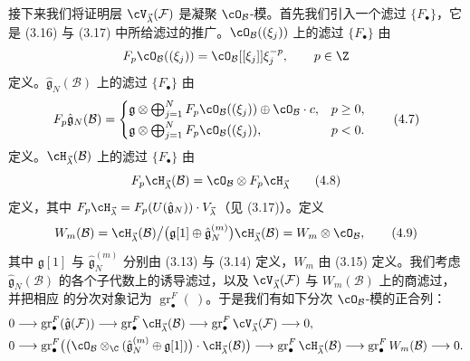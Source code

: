 接下来我们将证明层 $\cV_{\vec{\lambda}}(\mathcal{F})$ 是凝聚
$\cO_\mathcal{B}$-模。首先我们引入一个滤过 $\{F_\bullet\}$，它是 (3.16) 与
(3.17) 中所给滤过的推广。$\cO_\mathcal{B}((\xi_j))$ 上的滤过
$\{F_\bullet\}$ 由
\[
  F_p\cO_\mathcal{B}((\xi_j)) = \cO_\mathcal{B}[[\xi_j]]\xi_j^{-p},
  \qquad p\in\Z
\]
定义。$\hat{\mathfrak{g}}_N(\mathcal{B})$ 上的滤过 $\{F_\bullet\}$ 由
\begin{equation}
  F_p\hat{\mathfrak{g}}_N(\mathcal{B}) =
  \begin{cases}
    \mathfrak{g}\otimes\bigoplus_{j=1}^NF_p\cO_\mathcal{B}((\xi_j))
    \oplus\cO_\mathcal{B}\cdot c, & p\ge 0,\\[2pt]
    \mathfrak{g}\otimes\bigoplus_{j=1}^NF_p\cO_\mathcal{B}((\xi_j)), & p<0.
  \end{cases}
  \tag{4.7}
\end{equation}
定义。$\cH_{\vec{\lambda}}(\mathcal{B})$ 上的滤过 $\{F_\bullet\}$ 由
\begin{equation}
  F_p\cH_{\vec{\lambda}}(\mathcal{B})
  = \cO_\mathcal{B}\otimes F_p\cH_{\vec{\lambda}} \tag{4.8}
\end{equation}
定义，其中 $F_p\cH_{\vec{\lambda}}
=F_p(U(\hat{\mathfrak{g}}_N))\cdot V_{\vec{\lambda}}$（见 (3.17)）。定义
\begin{equation}
  W_m(\mathcal{B}) = \cH_{\vec{\lambda}}(\mathcal{B})
  \big/\bigl(\mathfrak{g}[1]\oplus\hat{\mathfrak{g}}_N^{(m)}\bigr)
  \cH_{\vec{\lambda}}(\mathcal{B})
  = W_m\otimes\cO_\mathcal{B}, \tag{4.9}
\end{equation}
其中 $\mathfrak{g}[1]$ 与 $\hat{\mathfrak{g}}_N^{(m)}$ 分别由 (3.13) 与 (3.14)
定义，$W_m$ 由 (3.15) 定义。我们考虑
$\hat{\mathfrak{g}}_N(\mathcal{B})$ 的各个子代数上的诱导滤过，以及
$\cV_{\vec{\lambda}}(\mathcal{F})$ 与 $W_m(\mathcal{B})$ 上的商滤过，并把相应
的分次对象记为 $\operatorname{gr}^F_\bullet(\ )$。于是我们有如下分次
$\cO_\mathcal{B}$-模的正合列：
\[
  \begin{aligned}
  0&\longrightarrow\operatorname{gr}^F_\bullet
    (\hat{\mathfrak{g}}(\mathcal{F}))
  \longrightarrow\operatorname{gr}^F_\bullet\cH_{\vec{\lambda}}(\mathcal{B})
  \longrightarrow\operatorname{gr}^F_\bullet\cV_{\vec{\lambda}}(\mathcal{F})
  \longrightarrow 0,\\
  0&\longrightarrow\operatorname{gr}^F_\bullet\bigl(
    \bigl(\cO_\mathcal{B}\otimes_\C(\hat{\mathfrak{g}}_N^{(m)}
    \oplus\mathfrak{g}[1])\bigr)\cdot\cH_{\vec{\lambda}}(\mathcal{B})\bigr)
  \longrightarrow\operatorname{gr}^F_\bullet\cH_{\vec{\lambda}}(\mathcal{B})
  \longrightarrow\operatorname{gr}^F_\bullet W_m(\mathcal{B})
  \longrightarrow 0 .
  \end{aligned}
\]
